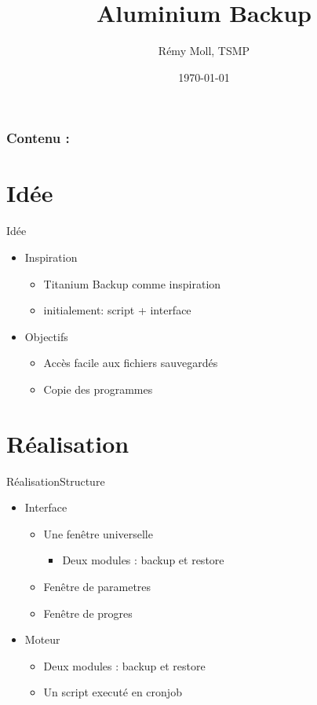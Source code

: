 \documentclass{beamer}
\title{Aluminium Backup}
\date{\today}
\author{Rémy Moll, TSMP}
\institute{DFG-Freiburg}
\begin{document}
	\begin{frame}[plain,t]
		\titlepage
	\end{frame}

	\begin{frame}%
		\frametitle{Contenu :}
		\tableofcontents
	\end{frame}

	\section{Idée}
	\begin{frame}{Idée}
	  \begin{itemize}
			\item Inspiration
			\begin{itemize}
				\item Titanium Backup comme inspiration
				\item initialement: script + interface
			\end{itemize}
			\item Objectifs
			\begin{itemize}
				\item Accès facile aux fichiers sauvegardés
				\item Copie des programmes
			\end{itemize}
	  \end{itemize}
	\end{frame}

	\section{Réalisation}
	\begin{frame}{Réalisation}{Structure}
	  \begin{itemize}
			\item Interface
			\begin{itemize}
			\item Une fenêtre universelle
			\begin{itemize}
				\item Deux modules : backup et restore
			\end{itemize}
			\item Fenêtre de parametres
			\item Fenêtre de progres
			\end{itemize}
			\item Moteur
			\begin{itemize}
				\item Deux modules : backup et restore
				\item Un script executé en cronjob
			\end{itemize}
	  \end{itemize}
	\end{frame}
\end{document}
